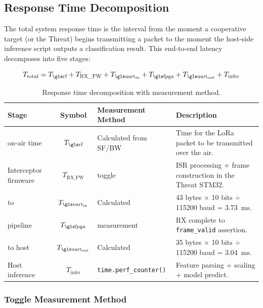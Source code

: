 \documentclass[11pt,letterpaper]{article}
\begin{document}
	\subsection{Response Time Decomposition}

	The total system response time is the interval from the moment a cooperative target (or the Threat) begins transmitting a packet to the moment the host-side inference script outputs a classification result. This end-to-end latency decomposes into five stages:

	\begin{equation}
		T_{\text{total}} = T_{\text{\RF{}}} + T_{\text{RX\_FW}} + T_{\text{\UART{}\textsubscript{in}}} + T_{\text{\FPGA{}}} + T_{\text{\UART{}\textsubscript{out}}} + T_{\text{infer}}
		\label{eq:total_latency}
	\end{equation}

	\begin{table}[ht!]
		\centering
		\caption{Response time decomposition with measurement method.}
		\label{tab:latency_decomp}
		\renewcommand{\arraystretch}{1.3}
		\begin{tabularx}{\textwidth}{l c l X}
			\toprule
			\textbf{Stage} & \textbf{Symbol} & \textbf{Measurement Method} & \textbf{Description} \\
			\midrule
			\RF{} on-air time & $T_{\text{\RF{}}}$ & Calculated from SF/BW & Time for the LoRa packet to be transmitted over the air. \\
			Interceptor firmware & $T_{\text{RX\_FW}}$ & \GPIO{} toggle & ISR processing + frame construction in the Threat STM32. \\
			\UART{} to \FPGA{} & $T_{\text{\UART{}\textsubscript{in}}}$ & Calculated & 43 bytes $\times$ 10 bits $\div$ 115200 baud = 3.73~ms. \\
			\FPGA{} pipeline & $T_{\text{\FPGA{}}}$ & \ILA{} measurement & \UART{} RX complete to \texttt{frame\_valid} assertion. \\
			\UART{} to host & $T_{\text{\UART{}\textsubscript{out}}}$ & Calculated & 35 bytes $\times$ 10 bits $\div$ 115200 baud = 3.04~ms. \\
			Host inference & $T_{\text{infer}}$ & \texttt{time.perf\_counter()} & Feature parsing + scaling + model predict. \\
			\bottomrule
		\end{tabularx}
	\end{table}

	\subsubsection{\GPIO{} Toggle Measurement Method}
\end{document}
